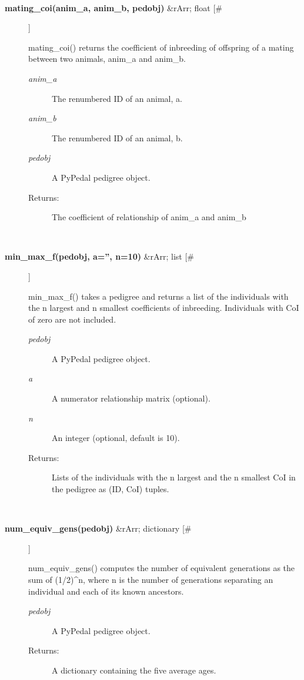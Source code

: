 \documentclass[10pt]{article}
\begin{document}
\begin{description}
\begin{description}
\end{description}
\\ 

\item[\textbf{mating\_coi(anim\_a, anim\_b, pedobj)}
 \&rArr; float [\#]]

 mating\_coi() returns the coefficient of inbreeding of offspring of a mating between two animals, anim\_a and anim\_b.
\begin{description}
\item[\emph{anim\_a}
] The renumbered ID of an animal, a.
\item[\emph{anim\_b}
] The renumbered ID of an animal, b.
\item[\emph{pedobj}
] A PyPedal pedigree object.
\item[Returns:] The coefficient of relationship of anim\_a and anim\_b

\end{description}
\\ 

\item[\textbf{min\_max\_f(pedobj, a='', n=10)}
 \&rArr; list [\#]]

 min\_max\_f() takes a pedigree and returns a list of the individuals with the n largest and n smallest coefficients of inbreeding. Individuals with CoI of zero are not included.
\begin{description}
\item[\emph{pedobj}
] A PyPedal pedigree object.
\item[\emph{a}
] A numerator relationship matrix (optional).
\item[\emph{n}
] An integer (optional, default is 10).
\item[Returns:] Lists of the individuals with the n largest and the n smallest CoI in the pedigree as (ID, CoI) tuples.

\end{description}
\\ 

\item[\textbf{num\_equiv\_gens(pedobj)}
 \&rArr; dictionary [\#]]

 num\_equiv\_gens() computes the number of equivalent generations as the sum of (1/2)\^{}n, where n is the number of generations separating an individual and each of its known ancestors.
\begin{description}
\item[\emph{pedobj}
] A PyPedal pedigree object.
\item[Returns:] A dictionary containing the five average ages.


\end{description}
\end{description}
\end{document}
